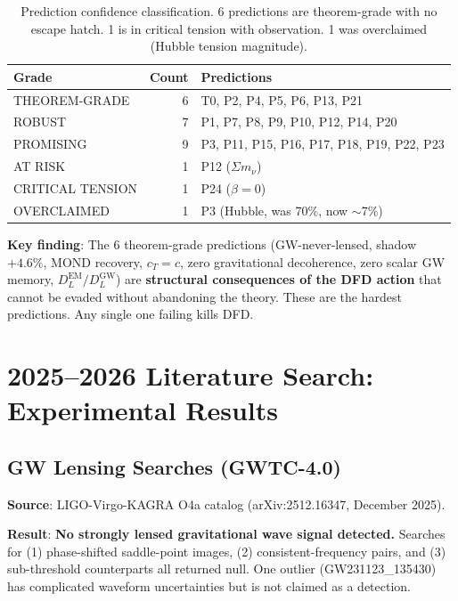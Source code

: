 \documentclass[11pt]{article}
\begin{document}
\begin{table}[h]
\centering
\begin{tabular}{lrl}
\toprule
\textbf{Grade} & \textbf{Count} & \textbf{Predictions} \\
\midrule
THEOREM-GRADE & 6 & T0, P2, P4, P5, P6, P13, P21 \\
ROBUST & 7 & P1, P7, P8, P9, P10, P12, P14, P20 \\
PROMISING & 9 & P3, P11, P15, P16, P17, P18, P19, P22, P23 \\
AT RISK & 1 & P12 ($\Sigma m_\nu$) \\
CRITICAL TENSION & 1 & P24 ($\beta = 0$) \\
OVERCLAIMED & 1 & P3 (Hubble, was 70\%, now $\sim$7\%) \\
\bottomrule
\end{tabular}
\caption{Prediction confidence classification. 6 predictions are theorem-grade with no escape hatch. 1 is in critical tension with observation. 1 was overclaimed (Hubble tension magnitude).}
\end{table}

\textbf{Key finding}: The 6 theorem-grade predictions (GW-never-lensed, shadow $+4.6\%$, MOND recovery, $c_T = c$, zero gravitational decoherence, zero scalar GW memory, $D_L^\text{EM}/D_L^\text{GW}$) are \textbf{structural consequences of the DFD action} that cannot be evaded without abandoning the theory. These are the hardest predictions. Any single one failing kills DFD.

\section{2025--2026 Literature Search: Experimental Results}

\subsection{GW Lensing Searches (GWTC-4.0)}

\textbf{Source}: LIGO-Virgo-KAGRA O4a catalog (arXiv:2512.16347, December 2025).

\textbf{Result}: \textbf{No strongly lensed gravitational wave signal detected.} Searches for (1) phase-shifted saddle-point images, (2) consistent-frequency pairs, and (3) sub-threshold counterparts all returned null. One outlier (GW231123\_135430) has complicated waveform uncertainties but is not claimed as a detection.
\end{document}
